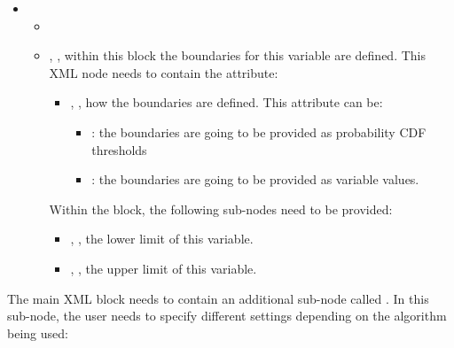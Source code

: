 \begin{itemize}
\item \variableDescription
 \subnodesIntro
 \begin{itemize}
    \item \distributionDescription
     \item {}, , within this
       block the boundaries for this variable are defined.
       This XML node needs to contain the attribute:
       \begin{itemize}
         \item {}, , how the
           boundaries are defined.
           This attribute can be:
           \begin{itemize}
             \item {}: the boundaries are going to be provided as
               probability CDF thresholds
             \item {}: the boundaries are going to be provided as
               variable values.
           \end{itemize}
       \end{itemize}
       Within the  block, the following sub-nodes need to be
       provided:
       \begin{itemize}
         \item {}, , the lower limit
           of this variable.
         \item {}, , the upper limit
           of this variable.
       \end{itemize}
 \end{itemize}
\end{itemize}
The main XML block  needs to contain an
additional sub-node called . 
In this sub-node, the user needs to specify different settings depending on the
algorithm being used:
